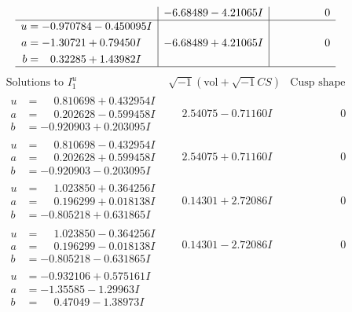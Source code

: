 \documentclass[1p]{elsarticle_modified}
\theoremstyle{definition}
\newcommand{\I}{\sqrt{-1}}
\begin{document}
$$\begin{array}{c|c|c}
 & -6.68489 - 4.21065 I & \phantom{-0.000000 } 0 \\ \hline\begin{aligned}
u &= -0.970784 - 0.450095 I \\
a &= -1.30721 + 0.79450 I \\
b &= \phantom{-}0.32285 + 1.43982 I\end{aligned}
 & -6.68489 + 4.21065 I & \phantom{-0.000000 } 0\\
 \hline 
 \end{array}$$\newpage$$\begin{array}{c|c|c}  
\text{Solutions to }I^u_{1}& \I (\text{vol} + \sqrt{-1}CS) & \text{Cusp shape}\\
 \hline 
\begin{aligned}
u &= \phantom{-}0.810698 + 0.432954 I \\
a &= \phantom{-}0.202628 - 0.599458 I \\
b &= -0.920903 + 0.203095 I\end{aligned}
 & \phantom{-}2.54075 - 0.71160 I & \phantom{-0.000000 } 0 \\ \hline\begin{aligned}
u &= \phantom{-}0.810698 - 0.432954 I \\
a &= \phantom{-}0.202628 + 0.599458 I \\
b &= -0.920903 - 0.203095 I\end{aligned}
 & \phantom{-}2.54075 + 0.71160 I & \phantom{-0.000000 } 0 \\ \hline\begin{aligned}
u &= \phantom{-}1.023850 + 0.364256 I \\
a &= \phantom{-}0.196299 + 0.018138 I \\
b &= -0.805218 + 0.631865 I\end{aligned}
 & \phantom{-}0.14301 + 2.72086 I & \phantom{-0.000000 } 0 \\ \hline\begin{aligned}
u &= \phantom{-}1.023850 - 0.364256 I \\
a &= \phantom{-}0.196299 - 0.018138 I \\
b &= -0.805218 - 0.631865 I\end{aligned}
 & \phantom{-}0.14301 - 2.72086 I & \phantom{-0.000000 } 0 \\ \hline\begin{aligned}
u &= -0.932106 + 0.575161 I \\
a &= -1.35585 - 1.29963 I \\
b &= \phantom{-}0.47049 - 1.38973 I\end{aligned}

\end{array}$$
\end{document}
